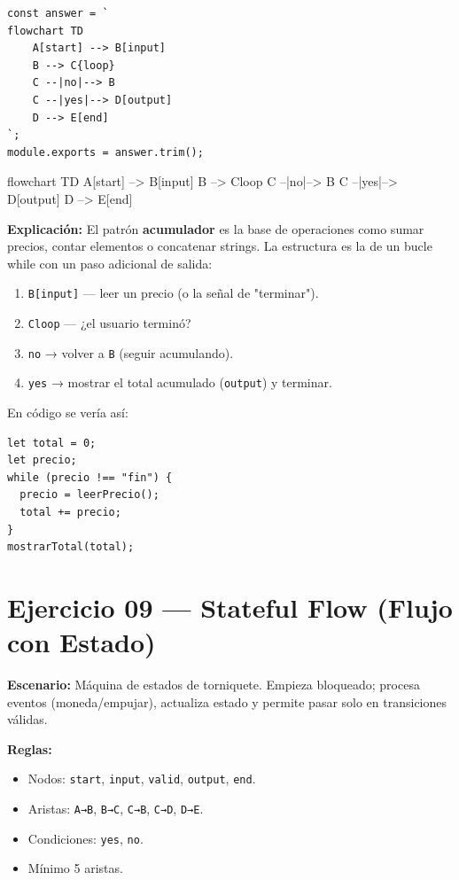 \documentclass[10pt,a4paper]{article}
\newenvironment{mermaid}[1][]
  {%
   \begin{mdframed}[%
     linecolor=blue!50!black,
     backgroundcolor=blue!3,
     innertopmargin=6pt,
     innerbottommargin=6pt,
     leftmargin=0pt,
     rightmargin=0pt,
     skipabove=10pt,
     skipbelow=10pt,
     frametitle={Diagrama Mermaid},
     frametitlefont={\small\bfseries\color{blue!70!black}},
   ]%
   \small\ttfamily
  }
  {%
   \end{mdframed}%
  }
\begin{document}
\begin{lstlisting}[style=jsstyle]
const answer = `
flowchart TD
    A[start] --> B[input]
    B --> C{loop}
    C --|no|--> B
    C --|yes|--> D[output]
    D --> E[end]
`;
module.exports = answer.trim();
\end{lstlisting}

\begin{mermaid}
flowchart TD
    A[start] --> B[input]
    B --> C{loop}
    C --|no|--> B
    C --|yes|--> D[output]
    D --> E[end]
\end{mermaid}

\textbf{Explicación:}
El patrón \textbf{acumulador} es la base de operaciones como sumar
precios, contar elementos o concatenar strings. La estructura es la de
un bucle while con un paso adicional de salida:
\begin{enumerate}
  \item \texttt{B[input]} — leer un precio (o la señal de "terminar").
  \item \texttt{C{loop}} — ¿el usuario terminó?
  \item \texttt{no} → volver a \texttt{B} (seguir acumulando).
  \item \texttt{yes} → mostrar el total acumulado (\texttt{output}) y
        terminar.
\end{enumerate}

En código se vería así:
\begin{lstlisting}[style=jsstyle]
let total = 0;
let precio;
while (precio !== "fin") {
  precio = leerPrecio();
  total += precio;
}
mostrarTotal(total);
\end{lstlisting}

\newpage

\section{Ejercicio 09 — Stateful Flow (Flujo con Estado)}

\textbf{Escenario:} Máquina de estados de torniquete. Empieza bloqueado;
procesa eventos (moneda/empujar), actualiza estado y permite pasar solo
en transiciones válidas.

\textbf{Reglas:}
\begin{itemize}
  \item Nodos: \texttt{start}, \texttt{input}, \texttt{valid},
        \texttt{output}, \texttt{end}.
  \item Aristas: \texttt{A→B}, \texttt{B→C}, \texttt{C→B},
        \texttt{C→D}, \texttt{D→E}.
  \item Condiciones: \texttt{yes}, \texttt{no}.
  \item Mínimo 5 aristas.
\end{itemize}
\end{document}
